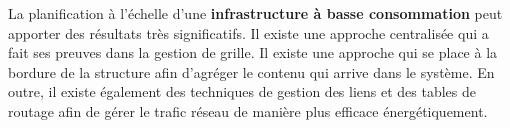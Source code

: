 
La planification à l'échelle d'une \textbf{infrastructure à basse consommation}
peut apporter des résultats très significatifs.  Il existe une approche
centralisée qui a fait ses preuves dans la gestion de grille. Il existe une
approche qui se place à la bordure de la structure afin d'agréger le contenu
qui arrive dans le système. En outre, il existe également des techniques de
gestion des liens et des tables de routage afin de gérer le trafic réseau de
manière plus efficace énergétiquement.
